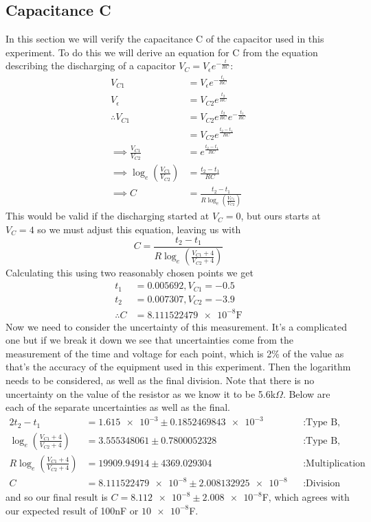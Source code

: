 \documentclass[12pt]{article}
\numberwithin{equation}{section}
\numberwithin{figure}{section}
\begin{document}
    \subsection{Capacitance C}
    In this section we will verify the capacitance C of the capacitor used in this experiment. To do this 
    we will derive an equation for C from the equation describing the discharging of a capacitor $V_{C} = V_\epsilon e^{-\frac{t}{RC}}$:
    \begin{align*}
        V_{C1} &= V_\epsilon e^{-\frac{t_1}{RC}} \\
        V_\epsilon &= V_{C2}e^{\frac{t_2}{RC}} \\
        \therefore V_{C1} &=  V_{C2}e^{\frac{t_2}{RC}}e^{-\frac{t_1}{RC}} \\
        &=V_{C2}e^{\frac{t_2-t_1}{RC}} \\
        \implies \frac{V_{C1}}{V_{C2}} &= e^{\frac{t_2-t_1}{RC}} \\
        \implies \log_e(\frac{V_{C1}}{V_{C2}}) &= \frac{t_2-t_1}{RC} \\
        \implies C &= \frac{t_2-t_1}{R\log_e(\frac{V_{C1}}{V_{C2}})}
    \end{align*}
    This would be valid if the discharging started at $V_C=0$, but ours starts at $V_C=4$ so we must adjust 
    this equation, leaving us with
    \begin{equation}
        C = \frac{t_2-t_1}{R\log_e(\frac{V_{C1}+4}{V_{C2}+4})}
        \label{eqn:capacitanceExperimental}
    \end{equation}
    Calculating this using two reasonably chosen points we get 
    \begin{align*}
        t_1&=0.005692, V_{C1}=-0.5 \\
        t_2&=0.007307, V_{C2}=-3.9 \\
        \therefore C&= \num{8.111522479e-8} \text{F}
    \end{align*}
    Now we need to consider the uncertainty of this measurement. It's a complicated one but if we break it 
    down we see that uncertainties come from the measurement of the time and voltage for each point, which 
    is 2\% of the value as that's the accuracy of the equipment used in this experiment. Then the logarithm 
    needs to be considered, as well as the final division. Note that there is no uncertainty on the value 
    of the resistor as we know it to be 5.6k$\Omega$. Below are each of the separate uncertainties as well 
    as the final.
    \begin{alignat*}{2}
        t_2-t_1 &=\num{1.615e-3}\pm \num{0.1852469843e-3} &&: \text{Type B, Addition Propagation}\\
        \log_e(\frac{V_{C1}+4}{V_{C2}+4})&=3.555348061\pm 0.7800052328 &&: \text{Type B, Function Propagation}\\
        R\log_e(\frac{V_{C1}+4}{V_{C2}+4})&=19909.94914 \pm 4369.029304 &&: \text{Multiplication by a Constant}\\
        C&= \num{8.111522479e-8} \pm \num{2.008132925e-8} &&: \text{Division Propagation}
    \end{alignat*}
    and so our final result is $C= \num{8.112e-8}\pm\num{2.008e-8}$F, which agrees with our expected 
    result of 100nF or $\num{10e-8}$F.
\end{document}

